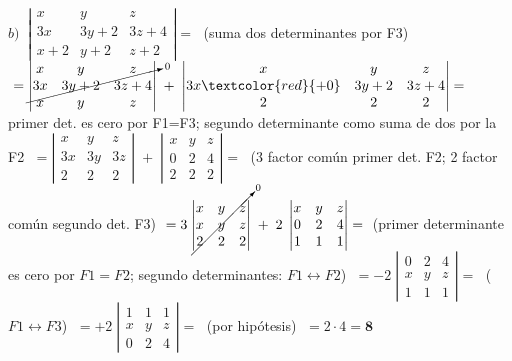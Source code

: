 \begin{proofw}
\noindent  $b)\; \; \left| \begin{matrix} x&y&z\\3x&3y+2&3z+4\\x+2&y+2&z+2  \end{matrix} \right| =\; $ \textcolor{gris}{(suma dos determinantes por F3)} $\; = \cancelto{0}{\left| \begin{matrix} x&y&z\\3x&3y+2&3z+4\\x&y&z  \end{matrix} \right|} \; + \; \left| \begin{matrix} x&y&z\\3x\textcolor{red}{+0}&3y+2&3z+4\\2&2&2  \end{matrix} \right| =\; $ \textcolor{gris}{primer det. es cero por F1=F3; segundo determinante como suma de dos por la F2} $\; = \left| \begin{matrix} x&y&z\\3x&3y&3z\\2&2&2  \end{matrix} \right| \; + \; \left| \begin{matrix} x&y&z\\0&2&4\\2&2&2  \end{matrix} \right| =\; $ \textcolor{gris}{(3 factor común primer det. F2; 2 factor común segundo det. F3)} $\; = 3\; \cancelto{0}{ \left| \begin{matrix} x&y&z\\x&y&z\\2&2&2  \end{matrix} \right|} \; + \; 2\; \left| \begin{matrix} x&y&z\\0&2&4\\1&1&1  \end{matrix} \right| =\; $ \textcolor{gris}{(primer determinante es cero por $F1=F2$; segundo determinantes: $F1\leftrightarrow F2$)} $\; =  -2\; \left| \begin{matrix} 0&2&4\\x&y&z\\1&1&1  \end{matrix} \right| =\; $  \textcolor{gris}{($F1 \leftrightarrow F3$)} $\; =  +2\; \left| \begin{matrix} 1&1&1\\x&y&z\\0&2&4  \end{matrix} \right| =\; $ \textcolor{gris}{(por hipótesis)} $\; = 2\cdot 4 = \boldsymbol{8}$

\end{proofw}

